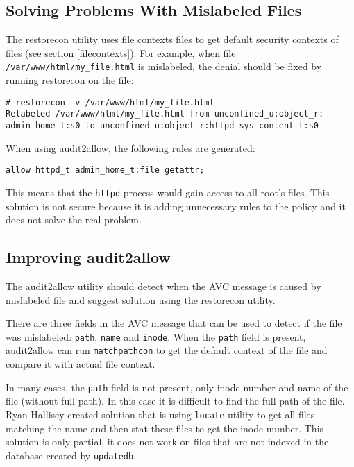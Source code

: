 \subsection{Solving Problems With Mislabeled Files}
The restorecon utility uses file contexts files to get default security contexts
of files (see section \ref{filecontexts}). For example, when file
\texttt{/var/www/html/my\_file.html} is mislabeled, the denial should be fixed
by running restorecon on the file:
\begin{lstlisting}
# restorecon -v /var/www/html/my_file.html
Relabeled /var/www/html/my_file.html from unconfined_u:object_r:
admin_home_t:s0 to unconfined_u:object_r:httpd_sys_content_t:s0
\end{lstlisting}

When using audit2allow, the following rules are generated:
\begin{lstlisting}
allow httpd_t admin_home_t:file getattr;
\end{lstlisting}
This means that the \texttt{httpd} process would gain access to all root's
files. This solution is not secure because it is adding unnecessary rules to the
policy and it does not solve the real problem.

\subsection{Improving audit2allow}
The audit2allow utility should detect when the AVC message is caused by
mislabeled file and suggest solution using the restorecon utility.

There are three fields in the AVC message that can be used to detect if the file
was mislabeled: \texttt{path}, \texttt{name} and \texttt{inode}. When the
\texttt{path} field is present, audit2allow can run \texttt{matchpathcon} to get
the default context of the file and compare it with actual file context.

In many cases, the \texttt{path} field is not present, only inode number and
name of the file (without full path). In this case it is difficult to find the
full path of the file. Ryan Hallisey created solution \cite{restoreconpullreq}
that is using \texttt{locate} utility to get all files matching the name and
then stat these files to get the inode number. This solution is only partial, it
does not work on files that are not indexed in the database created by
\texttt{updatedb}.

